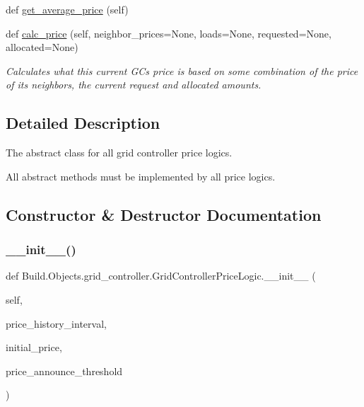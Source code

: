 \begin{DoxyCompactItemize}
def \hyperlink{class_build_1_1_objects_1_1grid__controller_1_1_grid_controller_price_logic_a2efaa2e5ead1f5d0d7d3d006940bfeba}{get\+\_\+average\+\_\+price} (self)
\item 
def \hyperlink{class_build_1_1_objects_1_1grid__controller_1_1_grid_controller_price_logic_ae4599f832b461c8fdbb66d90b95dd115}{calc\+\_\+price} (self, neighbor\+\_\+prices=None, loads=None, requested=None, allocated=None)
\begin{DoxyCompactList}\small\item\em Calculates what this current GC\textquotesingle{}s price is based on some combination of the price of its neighbors, the current request and allocated amounts. \end{DoxyCompactList}\end{DoxyCompactItemize}


\subsection{Detailed Description}
The abstract class for all grid controller price logics. 

All abstract methods must be implemented by all price logics. 

\subsection{Constructor \& Destructor Documentation}
\mbox{\label{class_build_1_1_objects_1_1grid__controller_1_1_grid_controller_price_logic_ad41a0d1f0d453c278938a1615352a2a3}} 
\subsubsection{\texorpdfstring{\+\_\+\+\_\+init\+\_\+\+\_\+()}{\_\_init\_\_()}}
{\footnotesize\ttfamily def Build.\+Objects.\+grid\+\_\+controller.\+Grid\+Controller\+Price\+Logic.\+\_\+\+\_\+init\+\_\+\+\_\+ (\begin{DoxyParamCaption}\item[{}]{self,  }\item[{}]{price\+\_\+history\+\_\+interval,  }\item[{}]{initial\+\_\+price,  }\item[{}]{price\+\_\+announce\+\_\+threshold }\end{DoxyParamCaption})}


